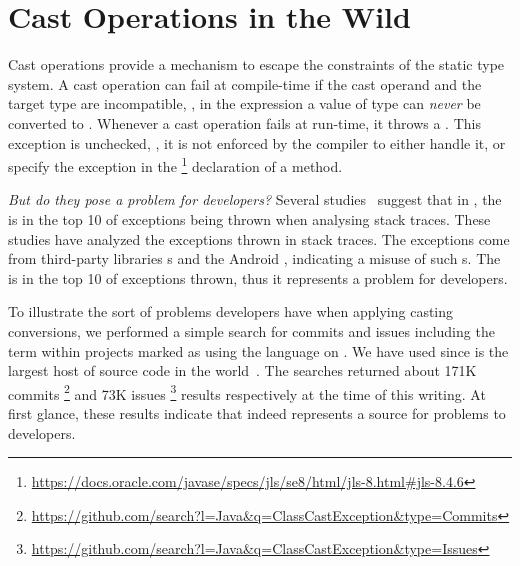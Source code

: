 
\chapter{Cast Operations in the Wild}
\label{cha:casts}

Cast operations provide a mechanism to escape the constraints of the static type system.
A cast operation can fail at compile-time if the cast operand and the target type are incompatible,
\eg, in the expression  a value of type  can \emph{never} be converted to .
Whenever a cast operation fails at run-time, it throws a .
This exception is unchecked, \ie,
it is not enforced by the compiler to either handle it, or
specify the exception in the %
\footnote{\url{https://docs.oracle.com/javase/specs/jls/se8/html/jls-8.html\#jls-8.4.6}}
declaration of a method.

\emph{But do they pose a problem for developers?}
Several studies~\citep{kechagiaUndocumentedUncheckedExceptions2014,coelhoUnveilingExceptionHandling2015,zhitnitskyTop10Exception2016}
suggest that in \java{},
%
%
the  is in the top 10 of exceptions being thrown when analysing stack traces.
These studies have analyzed the exceptions thrown in stack traces.
The exceptions come from third-party libraries \api{}s and the Android \api{},
indicating a misuse of such \api{}s.
The  is in the top 10 of exceptions thrown,
thus it represents a problem for developers.

To illustrate the sort of problems developers have when applying casting conversions,
%
%
we performed a simple search for commits and issues including the term  within projects marked as using the \java{} language on \github{}.
We have used \github{} since is the largest host of source code in the world~\citep{gousiosLeanGHTorrentGitHub2014}.
The searches returned about 171K commits%
\footnote{\url{https://github.com/search?l=Java&q=ClassCastException&type=Commits}}
and 73K issues%
\footnote{\url{https://github.com/search?l=Java&q=ClassCastException&type=Issues}}
%
%
results respectively at the time of this writing.
At first glance, these results indicate that  indeed represents a source for problems to developers.







